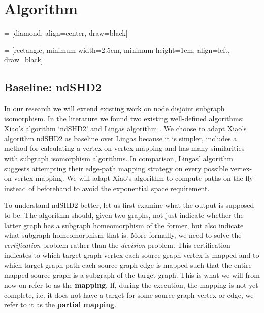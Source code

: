 \chapter{Algorithm}
\label{chapter:algorithm}

 = [diamond, align=center, draw=black]

 = [rectangle, minimum width=2.5cm, minimum height=1cm, align=left, draw=black]


\section{Baseline: ndSHD2}
In our research we will extend existing work on node disjoint subgraph isomorphism. In the literature we found two existing well-defined algorithms: Xiao's algorithm `ndSHD2' \cite{XIAONODEDISJOINT} and Lingas algorithm \cite{LINGAS2009464}. We choose to adapt Xiao's algorithm ndSHD2 as baseline over Lingas because it is simpler, includes a method for calculating a vertex-on-vertex mapping and has many similarities with subgraph isomorphism algorithms. In comparison, Lingas' algorithm suggests attempting their edge-path mapping strategy on every possible vertex-on-vertex mapping. We will adapt Xiao's algorithm to compute paths on-the-fly instead of beforehand to avoid the exponential space requirement.

To understand ndSHD2 better, let us first examine what the output is supposed to be. The algorithm should, given two graphs, not just indicate whether the latter graph has a subgraph homeomorphism of the former, but also indicate what subgraph homeomorphism that is. More formally, we need to solve the \textit{certification} problem rather than the \textit{decision} problem. This certification indicates to which target graph vertex each source graph vertex is mapped and to which target graph path each source graph edge is mapped such that the entire mapped source graph is a subgraph of the target graph. This is what we will from now on refer to as the \textbf{mapping}. If, during the execution, the mapping is not yet complete, i.e. it does not have a target for some source graph vertex or edge, we refer to it as the \textbf{partial mapping}.

